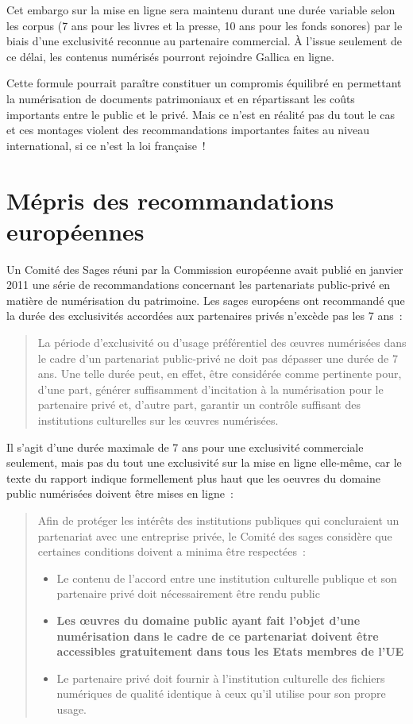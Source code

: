 Cet embargo sur la mise en ligne sera maintenu durant une durée variable selon les corpus (7 ans pour les livres et la presse, 10 ans pour les fonds sonores) par le biais d’une exclusivité reconnue au partenaire commercial. À l’issue seulement de ce délai, les contenus numérisés pourront rejoindre Gallica en ligne.

Cette formule pourrait paraître constituer un compromis équilibré en permettant la numérisation de documents patrimoniaux et en répartissant les coûts importants entre le public et le privé. Mais ce n’est en réalité pas du tout le cas et ces montages violent des recommandations importantes faites au niveau international, si ce n’est la loi française~!

\section{Mépris des recommandations européennes}

Un Comité des Sages réuni par la Commission européenne avait publié en janvier 2011 une série de recommandations concernant les partenariats public-privé en matière de numérisation du patrimoine. Les sages européens ont recommandé que la durée des exclusivités accordées aux partenaires privés n’excède pas les 7 ans~:

\begin{quotation}
La période d’exclusivité ou d’usage préférentiel des œuvres numérisées dans le cadre d’un partenariat public-privé ne doit pas dépasser une durée de 7 ans. Une telle durée peut, en effet, être considérée comme pertinente pour, d’une part, générer  suffisamment d’incitation à la numérisation pour le partenaire privé et, d’autre part, garantir un contrôle suffisant des institutions culturelles sur les œuvres numérisées.
\end{quotation}

Il s’agit d’une durée maximale de 7 ans pour une exclusivité commerciale seulement, mais pas du tout une exclusivité sur la mise en ligne elle-même, car le texte du rapport indique formellement plus haut que les oeuvres du domaine public numérisées doivent être mises en ligne~:

\begin{quotation}
Afin de protéger les intérêts des institutions publiques qui concluraient un partenariat avec une entreprise privée, le Comité des  sages considère que certaines conditions doivent a minima être respectées~:
\begin{itemize}
\item Le contenu de l’accord entre une institution culturelle publique et son partenaire privé doit nécessairement être rendu public
\item \textbf{Les œuvres du domaine public ayant fait l’objet d’une numérisation dans le cadre de ce partenariat doivent être accessibles gratuitement dans tous les 
Etats membres de l’UE}
\item Le partenaire privé doit fournir à l’institution culturelle des fichiers numériques de qualité identique à ceux qu’il utilise pour son propre usage.
\end{itemize}
\end{quotation}

